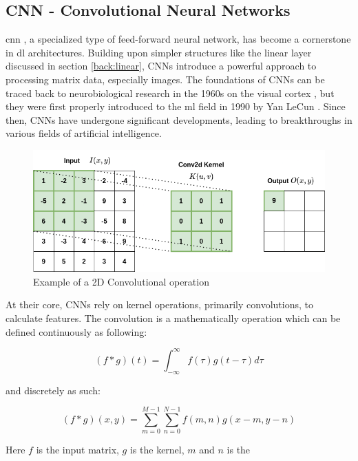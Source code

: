 \subsection{CNN - Convolutional Neural Networks}
\label{back:cnn}

\acrfull{cnn} \cite{}, a specialized type of feed-forward neural network, has become a cornerstone in \acrshort{dl} architectures. Building upon simpler structures like the linear layer discussed in section \ref{back:linear}, CNNs introduce a powerful approach to processing matrix data, especially images.
The foundations of CNNs can be traced back to neurobiological research in the 1960s on the visual cortex \cite{hubel1962receptive}, but they were first properly introduced to the \acrshort{ml} field in 1990 by Yan LeCun \cite{NIPS1989_53c3bce6}. Since then, CNNs have undergone significant developments, leading to breakthroughs in various fields of artificial intelligence. \\

\begin{figure}[!h]
    \centering
    \includegraphics[width=0.8\linewidth]{figures/convolution.png}
    \caption{Example of a 2D Convolutional operation}
    \label{fig:2dconv}
\end{figure}

At their core, CNNs rely on kernel operations, primarily convolutions, to calculate features. The convolution is a mathematically operation which can be defined continuously as following:

\begin{equation}
(f * g)(t) = \int_{-\infty}^{\infty} f(\tau) g(t - \tau) d\tau
\label{eq:contconv}
\end{equation}

and discretely as such:

\begin{equation}
   (f * g)(x, y) = \sum_{m=0}^{M-1} \sum_{n=0}^{N-1} f(m, n)g(x-m, y-n) 
\label{eq:conv}
\end{equation}

Here $f$ is the input matrix, $g$ is the kernel, $m$ and $n$ is the 

